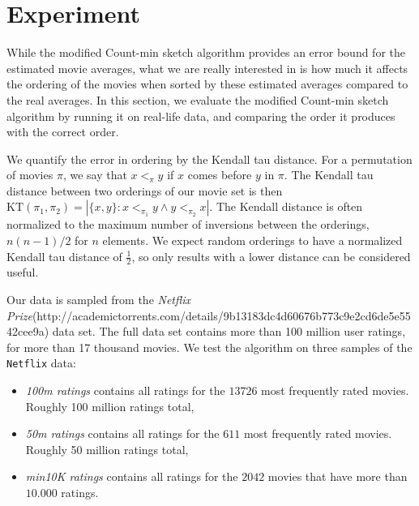 \section{Experiment}
While the modified Count-min sketch algorithm provides an error bound for the
estimated movie averages, what we are really interested in is how much it
affects the ordering of the movies when sorted by these estimated averages
compared to the real averages. In this section, we evaluate the modified
Count-min sketch algorithm by running it on real-life data, and comparing the
order it produces with the correct order. 

We quantify the error in ordering by the Kendall tau distance. For a permutation
of movies $\pi$, we say that $x <_\pi y$ if $x$ comes before $y$ in $\pi$. The
Kendall tau distance between two orderings of our movie set is then $\mathrm{KT}
\left(\pi_1,\pi_2\right) = \left|\{x,y\}: x <_{\pi_1} y \wedge y <_{\pi_2}
x\right|$. The Kendall distance is often normalized to the maximum number of
inversions between the orderings, $n(n-1)/2$ for $n$ elements. We expect random
orderings to have a normalized Kendall tau distance of $\frac{1}{2}$, so
only results with a lower distance can be considered useful.

Our data is sampled from the \textit{Netflix
Prize}(http://academictorrents.com/details/9b13183dc4d60676b773c9e2cd6de5e5542cee9a) data set.
The full data set contains more than 100 million user ratings, for more than 17
thousand movies.
We test the algorithm on three samples of the \texttt{Netflix} data:
\begin{itemize}
	\item \textit{100m ratings} contains all ratings for the $13726$ most
		frequently rated movies. Roughly 100 million ratings total,
	\item \textit{50m ratings} contains all ratings for the $611$ most
		frequently rated movies. Roughly 50 million ratings total,
	\item \textit{min10K ratings} contains all ratings for the $2042$ movies that have more
		than $10.000$ ratings.


\end{itemize}

\pgfplotsset{scaled x ticks=false}
\begin{center}
\end{center}
